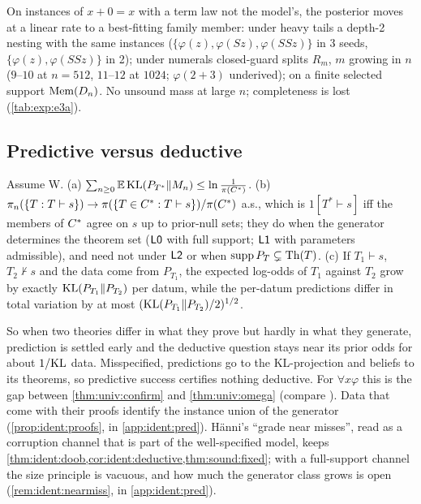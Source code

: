 \begin{remark}\label{rem:ident:e3a}
On instances of $x+0=x$ with a term law not the model's, the posterior moves at a linear rate to a best-fitting family member: under heavy tails a depth-2 nesting with the same instances ($\{\varphi(z),\varphi(Sz),\varphi(SSz)\}$ in 3 seeds, $\{\varphi(z),\varphi(SSz)\}$ in 2); under numerals closed-guard splits $R_m$, $m$ growing in $n$ ($9$--$10$ at $n=512$, $11$--$12$ at $1024$; $\varphi(2+3)$ underived); on a finite selected support $\mathrm{Mem}(D_n)$. No unsound mass at large $n$; completeness is lost (\cref{tab:exp:e3a}).
\end{remark}

\subsection{Predictive versus deductive}\label{sec:ident:pred}

\begin{theorem}\label{thm:ident:predded}
Assume W. (a) $\sum_{n\ge0}\mathbb{E}\,\mathrm{KL}(P_{T^*}\|M_n)\le\ln\frac1{\pi(C^{*})}$. (b) $\pi_n(\{T:T\vdash s\})\to\pi(\{T\in C^{*}:T\vdash s\})/\pi(C^{*})$ a.s., which is $1[T^*\vdash s]$ iff the members of $C^{*}$ agree on $s$ up to prior-null sets; they do when the generator determines the theorem set ($\mathord{\mathsf{L0}}$ with full support; $\mathord{\mathsf{L1}}$ with parameters admissible), and need not under $\mathord{\mathsf{L2}}$ or when $\operatorname{supp}P_T\subsetneq\mathrm{Th}(T)$. (c) If $T_1\vdash s$, $T_2\nvdash s$ and the data come from $P_{T_1}$, the expected log-odds of $T_1$ against $T_2$ grow by exactly $\mathrm{KL}(P_{T_1}\|P_{T_2})$ per datum, while the per-datum predictions differ in total variation by at most $(\mathrm{KL}(P_{T_1}\|P_{T_2})/2)^{1/2}$.
\end{theorem}

\noindent So when two theories differ in what they prove but hardly in what they generate, prediction is settled early and the deductive question stays near its prior odds for about $1/\mathrm{KL}$ data. Misspecified, predictions go to the KL-projection and beliefs to its theorems, so predictive success certifies nothing deductive. For $\forall x\varphi$ this is the gap between \cref{thm:univ:confirm} and \cref{thm:univ:omega} (compare \citealp{hutter2007universal}). Data that come with their proofs identify the instance union of the generator (\cref{prop:ident:proofs}, in \cref{app:ident:pred}). H\"anni's ``grade near misses'', read as a corruption channel that is part of the well-specified model, keeps \cref{thm:ident:doob,cor:ident:deductive,thm:sound:fixed}; with a full-support channel the size principle is vacuous, and how much the generator class grows is open (\cref{rem:ident:nearmiss}, in \cref{app:ident:pred}).
